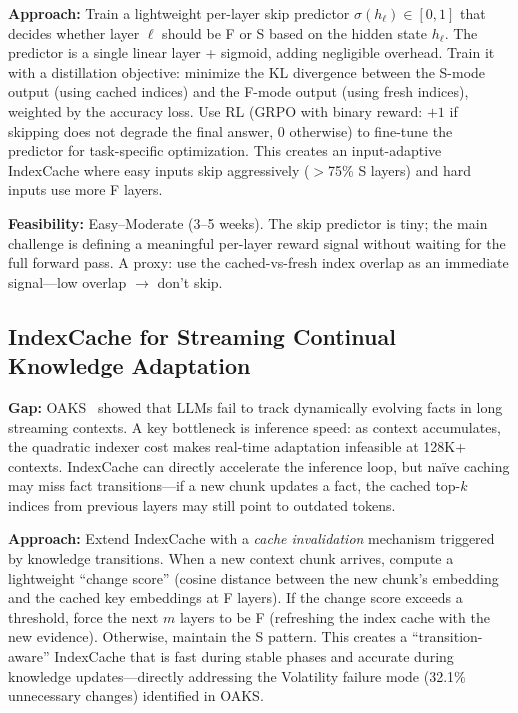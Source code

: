\documentclass[11pt]{article}
\begin{document}
\textbf{Approach:} Train a lightweight per-layer skip predictor $\sigma(h_\ell) \in [0, 1]$ that decides whether layer $\ell$ should be F or S based on the hidden state $h_\ell$. The predictor is a single linear layer + sigmoid, adding negligible overhead. Train it with a distillation objective: minimize the KL divergence between the S-mode output (using cached indices) and the F-mode output (using fresh indices), weighted by the accuracy loss. Use RL (GRPO with binary reward: $+1$ if skipping does not degrade the final answer, $0$ otherwise) to fine-tune the predictor for task-specific optimization. This creates an input-adaptive IndexCache where easy inputs skip aggressively ($>$75\% S layers) and hard inputs use more F layers.

\textbf{Feasibility:} Easy--Moderate (3--5 weeks). The skip predictor is tiny; the main challenge is defining a meaningful per-layer reward signal without waiting for the full forward pass. A proxy: use the cached-vs-fresh index overlap as an immediate signal---low overlap $\to$ don't skip.

\subsection{IndexCache for Streaming Continual Knowledge Adaptation}

\textbf{Gap:} OAKS~\citep{kim2026oaks} showed that LLMs fail to track dynamically evolving facts in long streaming contexts. A key bottleneck is inference speed: as context accumulates, the quadratic indexer cost makes real-time adaptation infeasible at 128K+ contexts. IndexCache can directly accelerate the inference loop, but na\"ive caching may miss fact transitions---if a new chunk updates a fact, the cached top-$k$ indices from previous layers may still point to outdated tokens.

\textbf{Approach:} Extend IndexCache with a \emph{cache invalidation} mechanism triggered by knowledge transitions. When a new context chunk arrives, compute a lightweight ``change score'' (cosine distance between the new chunk's embedding and the cached key embeddings at F layers). If the change score exceeds a threshold, force the next $m$ layers to be F (refreshing the index cache with the new evidence). Otherwise, maintain the S pattern. This creates a ``transition-aware'' IndexCache that is fast during stable phases and accurate during knowledge updates---directly addressing the Volatility failure mode (32.1\% unnecessary changes) identified in OAKS.
\end{document}
